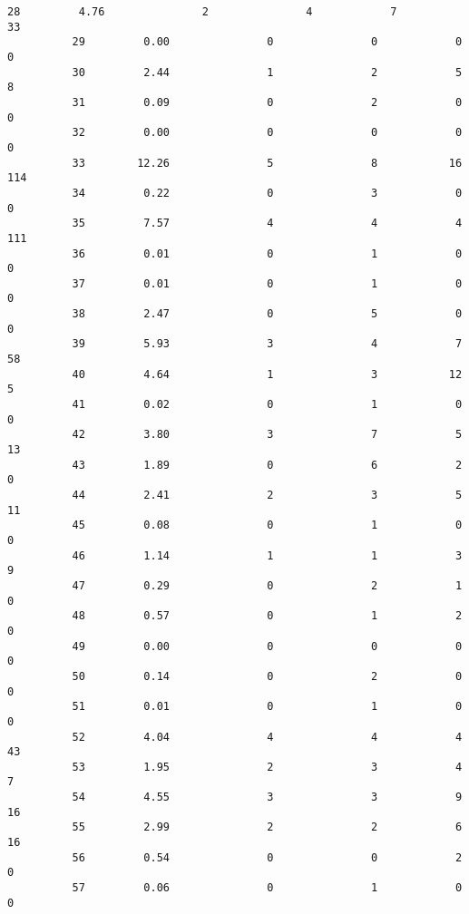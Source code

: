 \documentclass[11pt]{article}
\begin{document}
\begin{Verbatim}[commandchars=\\\{\}]
          28         4.76               2               4            7           33   
          29         0.00               0               0            0            0   
          30         2.44               1               2            5            8   
          31         0.09               0               2            0            0   
          32         0.00               0               0            0            0   
          33        12.26               5               8           16          114   
          34         0.22               0               3            0            0   
          35         7.57               4               4            4          111   
          36         0.01               0               1            0            0   
          37         0.01               0               1            0            0   
          38         2.47               0               5            0            0   
          39         5.93               3               4            7           58   
          40         4.64               1               3           12            5   
          41         0.02               0               1            0            0   
          42         3.80               3               7            5           13   
          43         1.89               0               6            2            0   
          44         2.41               2               3            5           11   
          45         0.08               0               1            0            0   
          46         1.14               1               1            3            9   
          47         0.29               0               2            1            0   
          48         0.57               0               1            2            0   
          49         0.00               0               0            0            0   
          50         0.14               0               2            0            0   
          51         0.01               0               1            0            0   
          52         4.04               4               4            4           43   
          53         1.95               2               3            4            7   
          54         4.55               3               3            9           16   
          55         2.99               2               2            6           16   
          56         0.54               0               0            2            0   
          57         0.06               0               1            0            0   

\end{Verbatim}
\end{document}
